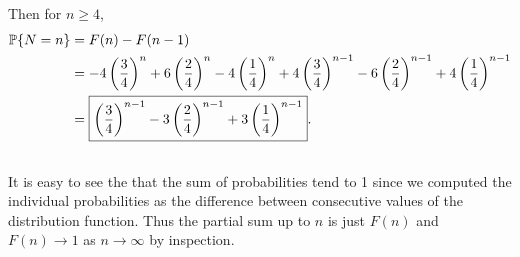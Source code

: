\documentclass[10pt]{article}
\DeclarePairedDelimiter{\set}{\lbrace}{\rbrace}
\renewcommand{\P}{\mathbb{P}}
\begin{document}
Then for $n\geq 4$,
\begin{align*}
  \P\set{N=n}
  &= F(n) - F(n-1) \\
  &= - 4 \left( \frac34 \right)^n + 6 \left( \frac24 \right)^n - 4 \left( \frac14 \right)^n
  + 4 \left( \frac34 \right)^{n-1} - 6 \left( \frac24 \right)^{n-1} + 4 \left( \frac14 \right)^{n-1} \\
  &= \boxed{\left( \frac34 \right)^{n-1} - 3 \left( \frac24 \right)^{n-1} + 3 \left( \frac14 \right)^{n-1}}.
\end{align*}

\subsection{}
It is easy to see the that the sum of probabilities tend to 1
since we computed the individual probabilities as the difference between consecutive values of the distribution function.
Thus the partial sum up to $n$ is just $F(n)$
and $F(n)\to 1$ as $n\to \infty$ by inspection.
\end{document}
